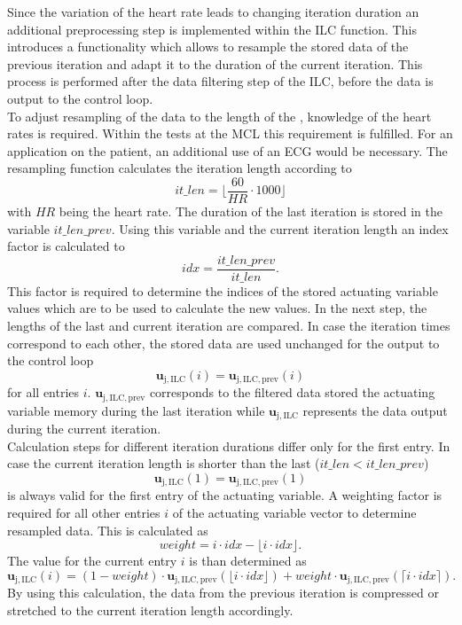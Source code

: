 Since the variation of the heart rate leads to changing iteration duration an additional preprocessing step is implemented within the ILC function. This introduces a functionality which allows to resample the stored data of the previous iteration and adapt it to the duration of the current iteration. This process is performed after the data filtering step of the ILC, before the data is output to the control loop.
\\To adjust resampling of the data to the length of the , knowledge of the heart rates is required. Within the tests at the MCL this requirement is fulfilled. For an application on the patient, an additional use of an ECG would be necessary.
The resampling function calculates the iteration length according to
\begin{equation}
  it\_len = \lfloor\frac{60}{HR}\cdot1000\rfloor
\end{equation}
with $HR$ being the heart rate. The duration of the last iteration is stored in the variable $it\_len\_prev$. Using this variable and the current iteration length an index factor is calculated to
\begin{equation}
  idx = \frac{it\_len\_prev}{it\_len}.
\end{equation}
This factor is required to determine the indices of the stored actuating variable values which are to be used to calculate the new values.
In the next step, the lengths of the last and current iteration are compared. In case the iteration times correspond to each other, the stored data are used unchanged for the output to the control loop
\begin{equation}
  \mathbf{u}_{\mathrm{j,ILC}}(i) = \mathbf{u}_{\mathrm{j,ILC,prev}}(i)
\end{equation} for all entries $i$. $\mathbf{u}_{\mathrm{j,ILC,prev}}$ corresponds to the filtered data stored the actuating variable memory during the last iteration while $\mathbf{u}_{\mathrm{j,ILC}}$ represents the data output during the current iteration.
\\Calculation steps for different iteration durations differ only for the first entry. In case the current iteration length is shorter than the last ($it\_len<it\_len\_prev$)
\begin{equation}
  \mathbf{u}_{\mathrm{j,ILC}}(1) = \mathbf{u}_{\mathrm{j,ILC,prev}}(1)
\end{equation} is always valid for the first entry of the actuating variable.
A weighting factor is required for all other entries $i$ of the actuating variable vector to determine resampled data. This is calculated as
\begin{equation}
  weight= i \cdot idx - \lfloor i \cdot idx\rfloor.
\end{equation}
The value for the current entry $i$ is than determined as
\begin{equation}
  \mathbf{u}_{\mathrm{j,ILC}}(i) = (1-weight) \cdot \mathbf{u}_{\mathrm{j,ILC,prev}}(\lfloor i \cdot idx\rfloor) + weight\cdot \mathbf{u}_{\mathrm{j,ILC,prev}}(\lceil i \cdot idx\rceil).
\end{equation}
By using this calculation, the data from the previous iteration is compressed or stretched to the current iteration length accordingly.

